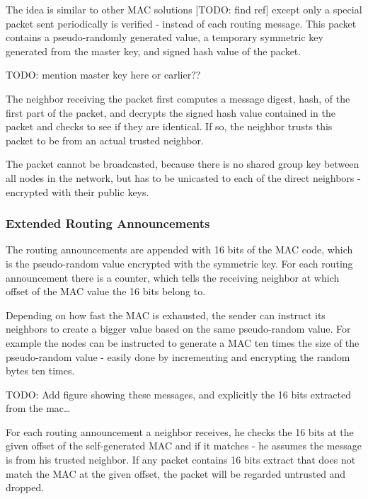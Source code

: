 The idea is similar to other \ac{MAC} solutions [TODO: find ref] except only a
special packet sent periodically is verified - instead of each routing message.
This packet contains a pseudo-randomly generated value, a temporary symmetric
key generated from the master key, and signed hash value of the packet.

TODO: mention master key here or earlier??

The neighbor receiving the packet first computes a message digest, hash, of the
first part of the packet, and decrypts the signed hash value contained in the
packet and checks to see if they are identical. If so, the neighbor trusts this
packet to be from an actual trusted neighbor.

The packet cannot be broadcasted, because there is no shared group key between
all nodes in the network, but has to be unicasted to each of the direct
neighbors - encrypted with their public keys.

\subsubsection*{Extended Routing Announcements}

The routing announcements are appended with 16 bits of the \ac{MAC} code, which
is the pseudo-random value encrypted with the symmetric key. For each routing
announcement there is a counter, which tells the receiving neighbor at which
offset of the \ac{MAC} value the 16 bits belong to.

Depending on how fast the \ac{MAC} is exhausted, the sender can instruct its
neighbors to create a bigger value based on the same pseudo-random value. For
example the nodes can be instructed to generate a \ac{MAC} ten times the size of
the pseudo-random value - easily done by incrementing and encrypting the random
bytes ten times.

TODO: Add figure showing these messages, and explicitly the 16 bits extracted
from the mac\ldots

For each routing announcement a neighbor receives, he checks the 16 bits at the
given offset of the self-generated \ac{MAC} and if it matches - he assumes the
message is from his trusted neighbor. If any packet contains 16 bits extract
that does not match the \ac{MAC} at the given offset, the packet will be
regarded untrusted and dropped.

